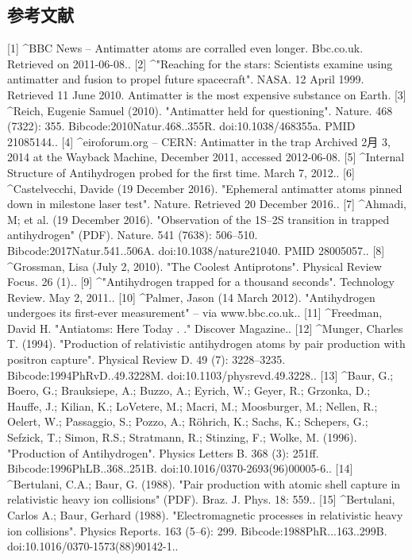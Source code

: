 \subsection{参考文献}
[1]
^BBC News – Antimatter atoms are corralled even longer. Bbc.co.uk. Retrieved on 2011-06-08..
[2]
^"Reaching for the stars: Scientists examine using antimatter and fusion to propel future spacecraft". NASA. 12 April 1999. Retrieved 11 June 2010. Antimatter is the most expensive substance on Earth.
[3]
^Reich, Eugenie Samuel (2010). "Antimatter held for questioning". Nature. 468 (7322): 355. Bibcode:2010Natur.468..355R. doi:10.1038/468355a. PMID 21085144..
[4]
^eiroforum.org – CERN: Antimatter in the trap Archived 2月 3, 2014 at the Wayback Machine, December 2011, accessed 2012-06-08.
[5]
^Internal Structure of Antihydrogen probed for the first time. March 7, 2012..
[6]
^Castelvecchi, Davide (19 December 2016). "Ephemeral antimatter atoms pinned down in milestone laser test". Nature. Retrieved 20 December 2016..
[7]
^Ahmadi, M; et al. (19 December 2016). "Observation of the 1S–2S transition in trapped antihydrogen" (PDF). Nature. 541 (7638): 506–510. Bibcode:2017Natur.541..506A. doi:10.1038/nature21040. PMID 28005057..
[8]
^Grossman, Lisa (July 2, 2010). "The Coolest Antiprotons". Physical Review Focus. 26 (1)..
[9]
^"Antihydrogen trapped for a thousand seconds". Technology Review. May 2, 2011..
[10]
^Palmer, Jason (14 March 2012). "Antihydrogen undergoes its first-ever measurement" – via www.bbc.co.uk..
[11]
^Freedman, David H. "Antiatoms: Here Today . ." Discover Magazine..
[12]
^Munger, Charles T. (1994). "Production of relativistic antihydrogen atoms by pair production with positron capture". Physical Review D. 49 (7): 3228–3235. Bibcode:1994PhRvD..49.3228M. doi:10.1103/physrevd.49.3228..
[13]
^Baur, G.; Boero, G.; Brauksiepe, A.; Buzzo, A.; Eyrich, W.; Geyer, R.; Grzonka, D.; Hauffe, J.; Kilian, K.; LoVetere, M.; Macri, M.; Moosburger, M.; Nellen, R.; Oelert, W.; Passaggio, S.; Pozzo, A.; Röhrich, K.; Sachs, K.; Schepers, G.; Sefzick, T.; Simon, R.S.; Stratmann, R.; Stinzing, F.; Wolke, M. (1996). "Production of Antihydrogen". Physics Letters B. 368 (3): 251ff. Bibcode:1996PhLB..368..251B. doi:10.1016/0370-2693(96)00005-6..
[14]
^Bertulani, C.A.; Baur, G. (1988). "Pair production with atomic shell capture in relativistic heavy ion collisions" (PDF). Braz. J. Phys. 18: 559..
[15]
^Bertulani, Carlos A.; Baur, Gerhard (1988). "Electromagnetic processes in relativistic heavy ion collisions". Physics Reports. 163 (5–6): 299. Bibcode:1988PhR...163..299B. doi:10.1016/0370-1573(88)90142-1..
